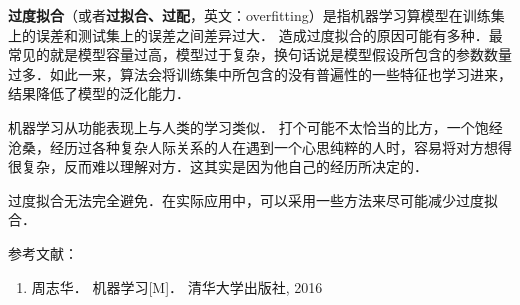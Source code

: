 
\textbf{过度拟合}（或者\textbf{过拟合、过配}，英文：overfitting）是指机器学习算模型在训练集上的误差和测试集上的误差之间差异过大．
造成过度拟合的原因可能有多种．最常见的就是模型容量过高，模型过于复杂，换句话说是模型假设所包含的参数数量过多．如此一来，算法会将训练集中所包含的没有普遍性的一些特征也学习进来，结果降低了模型的泛化能力．

机器学习从功能表现上与人类的学习类似．
打个可能不太恰当的比方，一个饱经沧桑，经历过各种复杂人际关系的人在遇到一个心思纯粹的人时，容易将对方想得很复杂，反而难以理解对方．这其实是因为他自己的经历所决定的．

过度拟合无法完全避免．在实际应用中，可以采用一些方法来尽可能减少过度拟合．



参考文献：
\begin{enumerate}
\item 周志华． 机器学习[M]． 清华大学出版社, 2016
\end{enumerate}